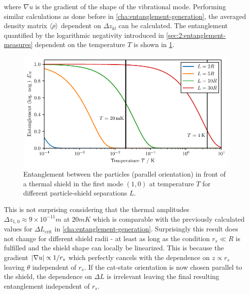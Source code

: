 where $\nabla u$ is the gradient of the shape of the vibrational mode.
Performing similar calculations as done before in \cref{cha:entanglement-generation}, the averaged density matrix $\left\langle\rho\right\rangle$ dependent on $\Delta z_{kl}$ can be calculated.
The entanglement quantified by the logarithmic negativity \cite{Plenio_2005} introduced in \cref{sec:2:entanglement-measures} dependent on the temperature $T$ is shown in \cref{fig:5:entanglement-temperature}.
\begin{figure}[!htbp]
  \centering
  \includegraphics[width=\textwidth]{./../figures/vibrations/entanglement-shield-T-L.pdf}
  \caption{Entanglement between the particles (parallel orientation) in front of a thermal shield in the first mode $(1,0)$ at temperature $T$ for different particle-shield separations $L$.}
  \label{fig:5:entanglement-temperature}
\end{figure}
This is not surprising considering that the thermal amplitudes $\Delta z_{1,0} \approx 9 \times 10^{-11}\si{m}$ at $20\si{mK}$ which is comparable with the previously calculated values for $\Delta L_\mathrm{crit}$ in \cref{cha:entanglement-generation}.
Surprisingly this result does not change for different shield radii - at least as long as the condition $r_s \ll R$ is fulfilled and the shield shape can locally be linearized.
This is because the gradient $\left\lvert\nabla u\right\rvert \propto 1/r_s$ which perfectly cancels with the dependence on $z \propto r_s$ leaving $\theta$ independent of $r_s$. 
If the cat-state orientation is now chosen parallel to the shield, the dependence on $\Delta L$ is irrelevant leaving the final resulting entanglement independent of $r_s$. 



